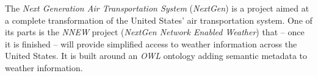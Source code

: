 \documentclass{scrartcl}
\begin{document}
The \textit{Next Generation Air Transportation System} (\textit{NextGen}) \cite{NextGen} is a project aimed at a complete transformation of the United States' air transportation system. One of its parts is the \textit{NNEW} project (\textit{NextGen Network Enabled Weather}) that -- once it is finished -- will provide simplified access to weather information across the United States. It is built around an \textit{OWL} ontology adding semantic metadata to weather information.



\end{document}
